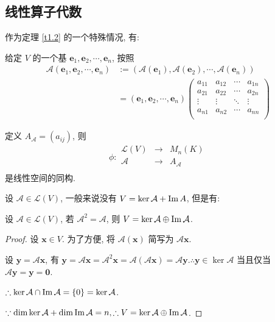 \documentclass{ctexart}
\begin{document}
\subsection{线性算子代数}
作为定理 \ref{t1.2} 的一个特殊情况, 有:
\begin{theorem}\label{t2.1}
    给定 $V$ 的一个基 $\boldsymbol{e}_1,\boldsymbol{e}_2,\cdots,\boldsymbol{e}_n$, 按照
    \begin{align*}
        \mathcal{A}(\boldsymbol{e}_1,\boldsymbol{e}_2,\cdots,\boldsymbol{e}_n) & :=(\mathcal{A}(\boldsymbol{e}_1),\mathcal{A}(\boldsymbol{e}_2),\cdots,\mathcal{A}(\boldsymbol{e}_n)) \\
        & =(\boldsymbol{e}_1,\boldsymbol{e}_2,\cdots,\boldsymbol{e}_n)\begin{pmatrix}
            a_{11} & a_{12} & \cdots & a_{1n} \\
            a_{21} & a_{22} & \cdots & a_{2n} \\
            \vdots & \vdots & \ddots & \vdots \\
            a_{n1} & a_{n2} & \cdots & a_{nn} \\
        \end{pmatrix}
    \end{align*}

    定义 $A_\mathcal{A}=(a_{ij})$, 则
    \[\phi:\begin{array}{rcl}
        \mathcal{L}(V) & \to & M_n(K) \\
        \mathcal{A} & \to & A_\mathcal{A} \\
    \end{array}\]
    是线性空间的同构.
\end{theorem}
设 $\mathcal{A}\in\mathcal{L}(V)$, 一般来说没有 $V=\ker\mathcal{A}+\operatorname{Im} A$, 但是有:
\begin{example}\label{exa2.1}
    设 $\mathcal{A}\in\mathcal{L}(V)$, 若 $\mathcal{A}^2=\mathcal{A}$, 则 $V=\ker\mathcal{A}\oplus\operatorname{Im} \mathcal{A}$.
\end{example}
\begin{proof}
    设 $\boldsymbol{x}\in V$. 为了方便, 将 $\mathcal{A}(\boldsymbol{x})$ 简写为 $\mathcal{A}\boldsymbol{x}$.

    设 $\boldsymbol{y}=\mathcal{A}\boldsymbol{x}$, 有 $\boldsymbol{y}=\mathcal{A}\boldsymbol{x}=\mathcal{A}^2\boldsymbol{x}=\mathcal{A}(\mathcal{A}\boldsymbol{x})=\mathcal{A}\boldsymbol{y}.\therefore\boldsymbol{y}\in\ker\mathcal{A}$ 当且仅当 $\mathcal{A}\boldsymbol{y}=\boldsymbol{y}=\boldsymbol{0}$.

    $\therefore\ker\mathcal{A}\cap\operatorname{Im} \mathcal{A}=\{0\}=\ker\mathcal{A}$.

    $\because\dim\ker\mathcal{A}+\dim\operatorname{Im} \mathcal{A}=n,\therefore V=\ker\mathcal{A}\oplus\operatorname{Im} \mathcal{A}$.
\end{proof}
\end{document}
